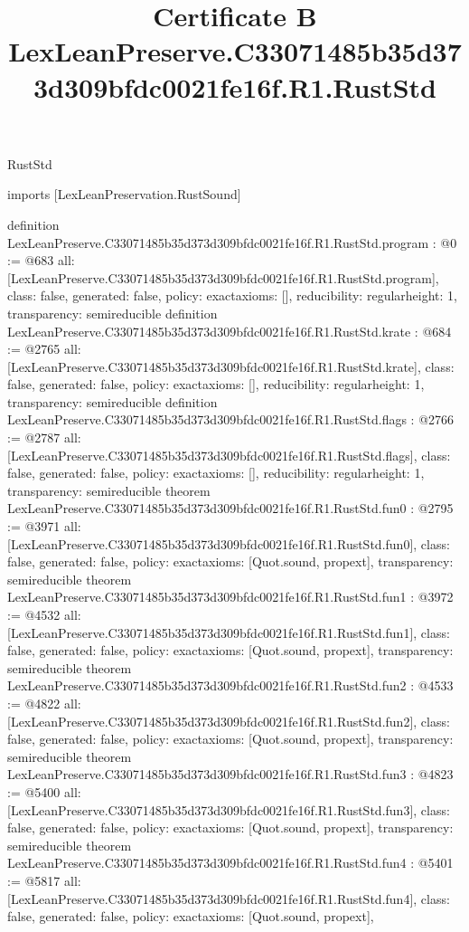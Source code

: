 \begin{lexlean}{RustStd}
\title{Certificate B LexLeanPreserve.C33071485b35d373d309bfdc0021fe16f.R1.RustStd}
\begin{coremodule}
imports [LexLeanPreservation.RustSound]

definition LexLeanPreserve.C33071485b35d373d309bfdc0021fe16f.R1.RustStd.program : @0 := @683 {
  all: [LexLeanPreserve.C33071485b35d373d309bfdc0021fe16f.R1.RustStd.program],
  class: false,
  generated: false,
  policy: exact{axioms: []},
  reducibility: regular{height: 1},
  transparency: semireducible
}
definition LexLeanPreserve.C33071485b35d373d309bfdc0021fe16f.R1.RustStd.krate : @684 := @2765 {
  all: [LexLeanPreserve.C33071485b35d373d309bfdc0021fe16f.R1.RustStd.krate],
  class: false,
  generated: false,
  policy: exact{axioms: []},
  reducibility: regular{height: 1},
  transparency: semireducible
}
definition LexLeanPreserve.C33071485b35d373d309bfdc0021fe16f.R1.RustStd.flags : @2766 := @2787 {
  all: [LexLeanPreserve.C33071485b35d373d309bfdc0021fe16f.R1.RustStd.flags],
  class: false,
  generated: false,
  policy: exact{axioms: []},
  reducibility: regular{height: 1},
  transparency: semireducible
}
theorem LexLeanPreserve.C33071485b35d373d309bfdc0021fe16f.R1.RustStd.fun0 : @2795 := @3971 {
  all: [LexLeanPreserve.C33071485b35d373d309bfdc0021fe16f.R1.RustStd.fun0],
  class: false,
  generated: false,
  policy: exact{axioms: [Quot.sound, propext]},
  transparency: semireducible
}
theorem LexLeanPreserve.C33071485b35d373d309bfdc0021fe16f.R1.RustStd.fun1 : @3972 := @4532 {
  all: [LexLeanPreserve.C33071485b35d373d309bfdc0021fe16f.R1.RustStd.fun1],
  class: false,
  generated: false,
  policy: exact{axioms: [Quot.sound, propext]},
  transparency: semireducible
}
theorem LexLeanPreserve.C33071485b35d373d309bfdc0021fe16f.R1.RustStd.fun2 : @4533 := @4822 {
  all: [LexLeanPreserve.C33071485b35d373d309bfdc0021fe16f.R1.RustStd.fun2],
  class: false,
  generated: false,
  policy: exact{axioms: [Quot.sound, propext]},
  transparency: semireducible
}
theorem LexLeanPreserve.C33071485b35d373d309bfdc0021fe16f.R1.RustStd.fun3 : @4823 := @5400 {
  all: [LexLeanPreserve.C33071485b35d373d309bfdc0021fe16f.R1.RustStd.fun3],
  class: false,
  generated: false,
  policy: exact{axioms: [Quot.sound, propext]},
  transparency: semireducible
}
theorem LexLeanPreserve.C33071485b35d373d309bfdc0021fe16f.R1.RustStd.fun4 : @5401 := @5817 {
  all: [LexLeanPreserve.C33071485b35d373d309bfdc0021fe16f.R1.RustStd.fun4],
  class: false,
  generated: false,
  policy: exact{axioms: [Quot.sound, propext]},
}
\end{coremodule}
\end{lexlean}
